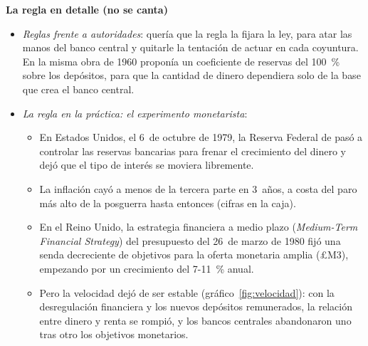 \documentclass[11pt]{article}
\begin{document}
\begin{anotaciones}
\textbf{La regla en detalle (no se canta)}
\begin{itemize}
\item \emph{Reglas frente a autoridades}:  quería que la regla la fijara la ley, para atar las manos del banco central y quitarle la tentación de actuar en cada coyuntura\nocite{Friedman1960Program,Friedman1962Capitalism}. En la misma obra de 1960 proponía un coeficiente de reservas del 100~\% sobre los depósitos, para que la cantidad de dinero dependiera solo de la base que crea el banco central\nocite{Friedman1960Program}.
\end{itemize}
\end{anotaciones}

\begin{itemize}
\item \emph{La regla en la práctica: el experimento monetarista}:
  \begin{itemize}
  \item En Estados Unidos, el 6~de octubre de 1979, la Reserva Federal de  pasó a controlar las reservas bancarias para frenar el crecimiento del dinero y dejó que el tipo de interés se moviera libremente\nocite{Medley2013Volcker}.
  \item La inflación cayó a menos de la tercera parte en 3~años, a costa del paro más alto de la posguerra hasta entonces (cifras en la caja).
  \item En el Reino Unido, la estrategia financiera a medio plazo (\emph{Medium-Term Financial Strategy}) del presupuesto del 26~de marzo de 1980 fijó una senda decreciente de objetivos para la oferta monetaria amplia (£M3), empezando por un crecimiento del 7-11~\% anual\nocite{Howe1980Budget}.
  \item Pero la velocidad dejó de ser estable (gráfico~\ref{fig:velocidad}): con la desregulación financiera y los nuevos depósitos remunerados, la relación entre dinero y renta se rompió, y los bancos centrales abandonaron uno tras otro los objetivos monetarios.
  \end{itemize}
\end{itemize}
\end{document}

